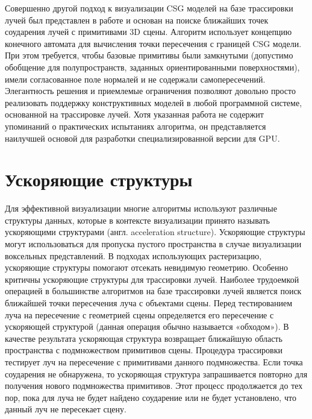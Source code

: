 Совершенно другой подход к визуализации CSG моделей  на базе трассировки лучей был представлен в работе \todo{[8]} и основан на поиске ближайших точек соударения лучей с  примитивами 3D сцены. Алгоритм использует концепцию конечного автомата для вычисления точки пересечения с границей CSG модели. При этом требуется, чтобы базовые примитивы были замкнутыми (допустимо обобщение для полупространств, заданных ориентированными поверхностями), имели согласованное поле нормалей и не содержали самопересечений. Элегантность решения и приемлемые ограничения позволяют довольно просто реализовать поддержку конструктивных моделей в любой программной системе, основанной на трассировке лучей. Хотя указанная работа не содержит упоминаний о практических испытаниях алгоритма, он представляется наилучшей основой для разработки специализированной версии для GPU.

\section{Ускоряющие структуры} \label{sect_acceleration_structures}

Для эффективной визуализации многие алгоритмы используют различные структуры данных, которые в контексте визуализации принято называть ускоряющими структурами (англ. acceleration structure). Ускоряющие структуры могут использоваться для пропуска пустого пространства в случае визуализации воксельных представлений. В подходах использующих растеризацию, ускоряющие структуры помогают отсекать невидимую геометрию. Особенно критичны ускоряющие структуры для трассировки лучей. Наиболее трудоемкой операцией в большинстве алгоритмов на базе трассировки лучей является поиск ближайшей точки пересечения луча с объектами сцены. Перед тестированием луча на пересечение с геометрией сцены определяется его пересечение с ускоряющей структурой (данная операция обычно называется «обходом»). В качестве результата ускоряющая структура возвращает ближайшую область пространства с подмножеством примитивов сцены. Процедура трассировки тестирует луч на пересечение с примитивами данного подмножества. Если точка соударения не обнаружена, то ускоряющая структура запрашивается повторно для получения нового подмножества примитивов. Этот процесс продолжается до тех пор, пока для луча не будет найдено соударение или не будет установлено, что данный луч не пересекает сцену.


